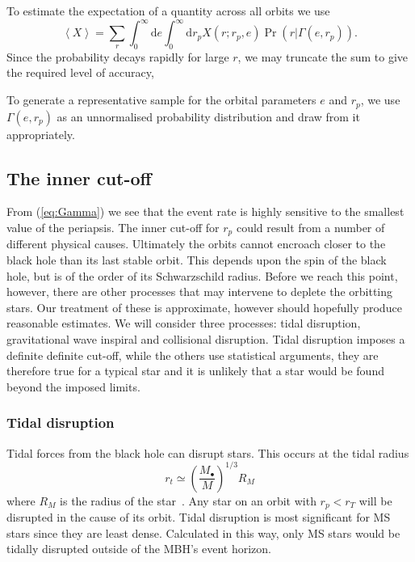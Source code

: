 \documentclass[useAMS,usedcolumn,usegraphicx,usenatbib]{mn2e}
\newcommand{\eqnref}[1]{(\ref{eq:#1})}
\newcommand{\dd}{\ensuremath{\mathrm{d}}}
\begin{document}
To estimate the expectation of a quantity across all orbits we use
\begin{equation}
\left\langle X\right\rangle = \sum_r \int_0^\infty \dd e \int_0^\infty \dd r_p X(r;r_p,e)\Pr(r|\Gamma(e, r_p)).
\end{equation}
Since the probability decays rapidly for large $r$, we may truncate the sum to give the required level of accuracy,

To generate a representative sample for the orbital parameters $e$ and $r_p$, we use $\Gamma(e, r_p)$ as an unnormalised probability distribution and draw from it appropriately.

\subsection{The inner cut-off}

From \eqnref{Gamma} we see that the event rate is highly sensitive to the smallest value of the periapsis. The inner cut-off for $r_p$ could result from a number of different physical causes. Ultimately the orbits cannot encroach closer to the black hole than its last stable orbit. This depends upon the spin of the black hole, but is of the order of its Schwarzschild radius. Before we reach this point, however, there are other processes that may intervene to deplete the orbitting stars. Our treatment of these is approximate, however should hopefully produce reasonable estimates. We will consider three processes: tidal disruption, gravitational wave inspiral and collisional disruption. Tidal disruption imposes a definite definite cut-off, while the others use statistical arguments, they are therefore true for a typical star and it is unlikely that a star would be found beyond the imposed limits.

\subsubsection{Tidal disruption}

Tidal forces from the black hole can disrupt stars. This occurs at the tidal radius
\begin{equation}
r_t \simeq \left(\frac{M_\bullet}{M}\right)^{1/3}R_M
\end{equation}
where $R_M$ is the radius of the star~\citep{Kobayashi2004}. Any star on an orbit with $r_p < r_T$ will be disrupted in the cause of its orbit. Tidal disruption is most significant for MS stars since they are least dense. Calculated in this way, only MS stars would be tidally disrupted outside of the MBH's event horizon.
\end{document}
